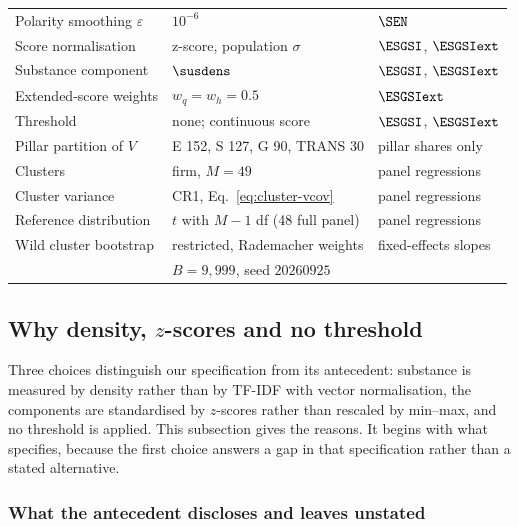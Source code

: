\begin{table}[tbp]
\begin{tabular}{lll}
Polarity smoothing $\varepsilon$ & $10^{-6}$ & $\SEN$ \\
Score normalisation              & z-score, population $\sigma$ & $\ESGSI$, $\ESGSIext$ \\
Substance component              & $\susdens$ & $\ESGSI$, $\ESGSIext$ \\
Extended-score weights           & $w_q = w_h = 0.5$ & $\ESGSIext$ \\
Threshold                        & none; continuous score & $\ESGSI$, $\ESGSIext$ \\
\midrule
Pillar partition of $V$          & E 152, S 127, G 90, TRANS 30 & pillar shares only \\
Clusters                         & firm, $M = 49$ & panel regressions \\
Cluster variance                 & CR1, Eq.~\eqref{eq:cluster-vcov} & panel regressions \\
Reference distribution           & $t$ with $M-1$ df (48 full panel) & panel regressions \\
Wild cluster bootstrap           & restricted, Rademacher weights & fixed-effects slopes \\
                                 & $B = 9{,}999$, seed $20260925$ & \\
\bottomrule
\end{tabular}
\end{table}

\subsection{Why density, \texorpdfstring{$z$}{z}-scores and no threshold}
\label{sec:justification}

Three choices distinguish our specification from its antecedent: substance is
measured by density rather than by TF-IDF with vector normalisation, the
components are standardised by $z$-scores rather than rescaled by min--max,
and no threshold is applied. This subsection gives the reasons. It begins with
what \citet{lagasio2024} specifies, because the first choice answers a gap in
that specification rather than a stated alternative.

\subsubsection{What the antecedent discloses and leaves unstated}
\label{sec:original}

